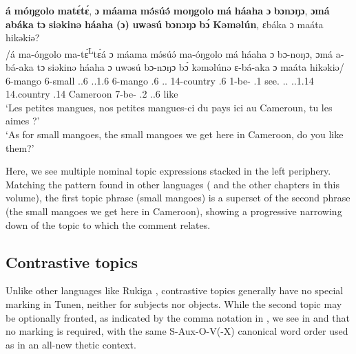 \documentclass[output=paper,colorlinks,citecolor=brown
]{langscibook}
\begin{document}
\ea
\label{whichmangoes}
\glll
{\db}\textbf{á} \textbf{móŋgolo} \textbf{matɛ́\ds{}tɛ́}, \textbf{ɔ} \textbf{máama} \textbf{mə́súə́} \textbf{moŋgolo} \textbf{má} \textbf{háaha} \textbf{ɔ} \textbf{bɔnɔŋɔ}, \textbf{ɔmá} \textbf{abáka} \textbf{tɔ} \textbf{siəkinə} \textbf{háaha} \textbf{(ɔ)} \textbf{uwəsú} \textbf{bɔnɔŋɔ} \textbf{bɔ́} \textbf{Kəməlún}, ɛbáka ɔ maáta hikəkiə?  \\
/á ma-óŋgolo ma-tɛ́\textsuperscript{L}tɛ́á ɔ máama mə́súə́ ma-óŋgolo má háaha ɔ bɔ-noŋɔ, ɔmá a-bá-aka tɔ siəkinə háaha ɔ uwəsú bɔ-nɔŋɔ bɔ́ kəməlúnə ɛ-bá-aka ɔ maáta hikəkiə/ \\
{\db}\PREP{} 6-mango 6-small \PREP{} \DEM{}.\PROX{}.6{} \PRO{}.\POSS{}.1\PL{}.6{} 6-mango \ASS{}.6{} \DEM.\PROX.\LOC{} \PREP{} 14-country \REL{}.6{} 1\SM{}-{}be-\DUR{} \SM{}.1\PL{} see.\DUR{} \DEM.\PROX.\LOC{} \PREP{} \PRO{}.\POSS{}.1\PL{}.14{} 14.country \ASS{}.14{} Cameroon 7\SM{}-{}be-\DUR{} \SM{}.2\SG{} \PRO{}.\OBJ{}.6{} like \\
\glt
`Les petites mangues, nos petites mangues-ci du pays ici au Cameroun, tu les aimes ?' \\ `As for small mangoes, the small mangoes we get here in Cameroon, do you like them?' \jambox*{[PM 950] }
\z

Here, we see multiple nominal topic expressions stacked in the left periphery. Matching the pattern found in other languages (\citealt[see e.g.][]{PaulWhitman2017} and the other chapters in this volume), the first topic phrase (small mangoes) is a superset of the second phrase (the small mangoes we get here in Cameroon), showing a progressive narrowing down of the topic to which the comment relates.

\subsection{Contrastive topics}
Unlike other languages like Rukiga \parencite{chapters/rukiga}, contrastive topics generally have no special marking in Tunen, neither for subjects nor objects. While the second topic may be optionally fronted, as indicated by the comma notation in , we see in  and  that no marking is required, with the same S-Aux-O-V(-X) canonical word order used as in an all-new thetic context.
\largerpage[2]
\end{document}
